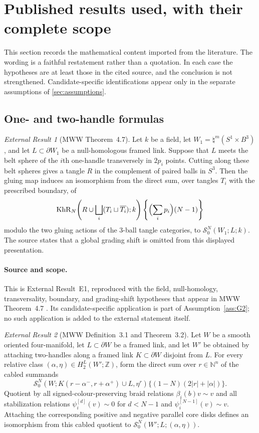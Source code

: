 \documentclass[10pt,reqno]{amsart}
\theoremstyle{definition}
\theoremstyle{remark}
\newtheorem{externalresult}{External Result}
\newcommand{\Z}{\mathbb Z}
\newcommand{\N}{\mathbb N}
\newcommand{\KhR}{\operatorname{KhR}}
\newcommand{\SLM}{\mathcal S}
\begin{document}
\section{Published results used, with their complete scope}\label{sec:external-results}

This section records the mathematical content imported from the literature.
The wording is a faithful restatement rather than a quotation.  In each case
the hypotheses are at least those in the cited source, and the conclusion is
not strengthened.  Candidate-specific identifications appear only in the
separate assumptions of \cref{sec:assumptions}.

\subsection{One- and two-handle formulas}

\begin{externalresult}[MWW Theorem~4.7]\label{prop:mww-4.7}
Let $k$ be a field, let $W_1=\natural^m(S^1\times B^3)$, and let
$L\subset\partial W_1$ be a null-homologous framed link.  Suppose that $L$
meets the belt sphere of the $i$th one-handle transversely in $2p_i$ points.
Cutting along these belt spheres gives a tangle $R$ in the complement of
paired balls in $S^3$.  Then the gluing map induces an isomorphism from the
direct sum, over tangles $T_i$ with the prescribed boundary, of
\[
 \KhR_N\!\left(R\cup\bigsqcup_i(T_i\sqcup\overline{T_i});k\right)
 \left\{\Bigl(\sum_i p_i\Bigr)(N-1)\right\}
\]
modulo the two gluing actions of the $3$-ball tangle categories, to
$\SLM^N_0(W_1;L;k)$.  The source states that a global grading shift is omitted
from this displayed presentation.
\end{externalresult}

\paragraph{Source and scope.}
This is External Result~E1, reproduced with the field, null-homology,
transversality, boundary, and grading-shift hypotheses that appear in MWW
Theorem~4.7 \cite[Theorem~4.7]{MWW2023Handles}.  Its candidate-specific
application is part of Assumption~\ref{ass:G2}; no such application is added
to the external statement itself.

\begin{externalresult}[MWW Definition~3.1 and Theorem~3.2]\label{prop:mww-3.2}
Let $W$ be a smooth oriented four-manifold, let $L\subset\partial W$ be a
framed link, and let $W'$ be obtained by attaching two-handles along a framed
link $K\subset\partial W$ disjoint from $L$.  For every relative class
$(\alpha,\eta)\in H_2^L(W';\Z)$, form the direct sum over $r\in\N^n$ of the
cabled summands
\[
 \SLM^N_0\!\left(W;K(r-\alpha^-,r+\alpha^+)\cup L,\eta^r\right)
 \{(1-N)(2|r|+|\alpha|)\}.
\]
Quotient by all signed-colour-preserving braid relations
$\beta_i(b)v\sim v$ and all stabilization relations
$\psi_i^{[d]}(v)\sim0$ for $d<N-1$ and
$\psi_i^{[N-1]}(v)\sim v$.  Attaching the corresponding positive and
negative parallel core disks defines an isomorphism from this cabled quotient
to $\SLM^N_0(W';L;(\alpha,\eta))$.
\end{externalresult}
\end{document}
